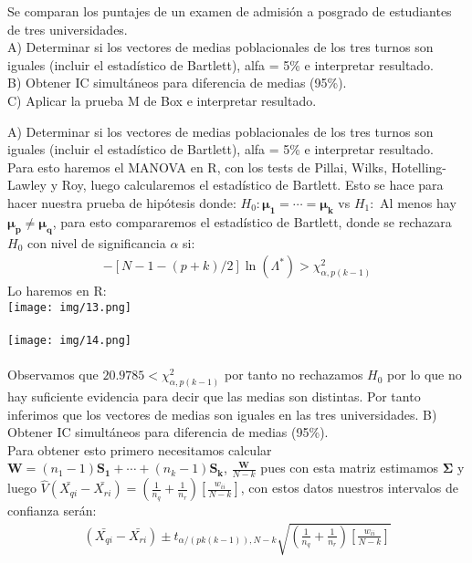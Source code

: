 \begin{problem}{4}
Se comparan los puntajes de un examen de admisión a posgrado de estudiantes de tres universidades.\\
A) Determinar si los vectores de medias poblacionales de los tres turnos son iguales (incluir el
estadístico de Bartlett), alfa = 5\% e interpretar resultado.\\
B) Obtener IC simultáneos para diferencia de medias (95\%).\\
C) Aplicar la prueba M de Box e interpretar resultado.
\end{problem}
\begin{sol}
A) Determinar si los vectores de medias poblacionales de los tres turnos son iguales (incluir el
estadístico de Bartlett), alfa = 5\% e interpretar resultado.\\
Para esto haremos el MANOVA en R, con los tests de Pillai, Wilks, Hotelling-Lawley y Roy, luego calcularemos el estadístico de Bartlett. Esto se hace para hacer nuestra prueba de hipótesis donde:
$H_0:\bm{\mu_1}=\cdots = \bm{\mu_k}$ vs $H_1:$ Al menos hay $\bm{\mu_p} \neq \bm{\mu_q}$, para esto compararemos el estadístico de Bartlett, donde se rechazara $H_0$ con nivel de significancia $\alpha$ si:
\begin{align*}
-[N-1-(p+k)/2]\ln{(\Lambda^*)}>\chi_{\alpha,p(k-1)}^2
\end{align*}
Lo haremos en R:\\
\texttt{[image: img/13.png]}\\\\
\texttt{[image: img/14.png]}\\\\
Observamos que $20.9785 < \chi_{\alpha,p(k-1)}^2$ por tanto no rechazamos $H_0$ por lo que no hay suficiente evidencia para decir que las medias son distintas. Por tanto inferimos que los vectores de medias son iguales en las tres universidades. 
B) Obtener IC simultáneos para diferencia de medias (95\%).\\
Para obtener esto primero necesitamos calcular $\bm{W}=(n_1-1)\bm{S_1}+\cdots+(n_k-1)\bm{S_k}$, $\frac{\bm{W}}{N-k}$ pues con esta matriz estimamos $\bm{\Sigma}$ y luego $\hat{V}(\bar{X_{qi}}-\bar{X_{ri}})=(\frac{1}{n_q}+\frac{1}{n_r})[\frac{w_{ii}}{N-k}]$, con estos datos nuestros intervalos de confianza serán:
\begin{align*}
(\bar{X_{qi}}-\bar{X_{ri}}) \pm t_{\alpha/(pk(k-1)),N-k}\sqrt{(\frac{1}{n_q}+\frac{1}{n_r})[\frac{w_{ii}}{N-k}]}
\end{align*}

\end{sol}
